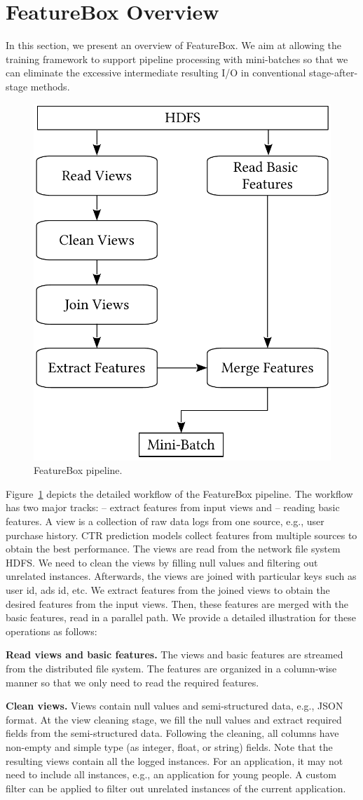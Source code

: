 \documentclass[conference]{IEEEtran}
\begin{document}
\section{FeatureBox Overview}
In this section, we present an overview of FeatureBox. We aim at allowing the training framework to support pipeline processing with mini-batches so that we can eliminate the excessive intermediate resulting I/O in conventional stage-after-stage methods.

\begin{figure}[htbp]
\centering
\includegraphics[width=.3\textwidth]{figs/pipeline}
\caption{FeatureBox pipeline.}\label{fig:pipeline}
\end{figure}

Figure~\ref{fig:pipeline} depicts the detailed workflow of the FeatureBox pipeline. 
The workflow has two major tracks: -- extract features from input views and -- reading basic features. 
A view is a collection of raw data logs from one source, e.g., user purchase history. CTR prediction models collect features from multiple sources to obtain the best performance. The views are read from the network file system HDFS. We need to clean the views by filling null values and filtering out unrelated instances. Afterwards, the views are joined with particular keys such as user id, ads id, etc. We extract features from the joined views to obtain the desired features from the input views. Then, these features are merged with the basic features, read in a parallel path. We provide a detailed illustration for these operations as follows:

\textbf{Read views and basic features.}
The views and basic features are streamed from the distributed file system. The features are organized in a column-wise manner so that we only need to read the required features. 

\textbf{Clean views.} 
Views contain null values and semi-structured data, e.g., JSON format. 
At the view cleaning stage, we fill the null values and extract required fields from the semi-structured data. 
Following the cleaning, all columns have non-empty and simple type (as integer, float, or string) fields. Note that the resulting views contain all the logged instances. For an application, it may not need to include all instances, e.g., an application for young people. A custom filter can be applied to filter out unrelated instances of the current application.
\end{document}
